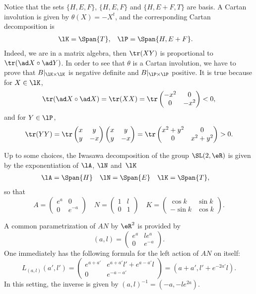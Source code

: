 Notice that the sets $\{ H,E,F \}$, $\{ H,E,F \}$ and $\{ H,E+F,T \}$ are basis. A Cartan involution is given by $\theta(X)=-X^t$, and the corresponding Cartan decomposition is
\begin{align}
   \lK&=\Span\{ T \},
&\lP&=\Span\{ H,E+F \}.
\end{align}
Indeed, we are in a matrix algebra, then $\tr(XY)$ is proportional to $\tr(\ad X\circ \ad Y)$.
 In order to see that $\theta$ is a Cartan involution, we have to prove that $B|_{\lK\times\lK}$ is negative definite and $B|_{\lP\times\lP}$ positive. It is true because for $X\in\lK$,
\[
    \tr(\ad X\circ \ad X)=\tr(XX)=\tr\begin{pmatrix}
-x^2 & 0 \\
0 & -x^2
\end{pmatrix}<0,
\]
and for $Y\in\lP$,
\[
    \tr(YY)=\tr\begin{pmatrix}
x & y \\
y & -x
\end{pmatrix}\begin{pmatrix}
x & y \\
y & -x
\end{pmatrix} =\tr\begin{pmatrix}
x^2+y^2 & 0 \\
0 & x^2+y^2
\end{pmatrix} >0.
\]

Up to some choices, the Iwasawa decomposition\label{pg_iwasldr} of the group $\SL(2,\eR)$ is given by the exponentiation of $\lA$, $\lN$ and~$\lK$
\begin{equation}
\begin{aligned}
  \lA&=\Span\{ H \}
&\lN&=\Span\{ E \}
&\lK&=\Span\{T\},
\end{aligned}
\end{equation}
so that
\begin{equation}\label{eq:expo_ANK}
A=\begin{pmatrix}
e^a & 0 \\
0 & e^{-a}
\end{pmatrix}\quad
N=\begin{pmatrix}
1 & l \\
0 & 1
\end{pmatrix}\quad
K=\begin{pmatrix}
\cos k & \sin k \\
-\sin k & \cos k
\end{pmatrix}.
\end{equation}

A common parametrization of $AN$ by $\eR^2$ is provided by
\begin{equation}   \label{EqParmalSL}
(a,l)=
\begin{pmatrix}
  e^a&le^a\\
  0  &e^{-a}
\end{pmatrix}.
\end{equation}
One immediately has the following formula for the left action of $AN$ on itself:
\[
  L_{(a,l)}(a',l')=\begin{pmatrix}
e^{a+a'} & e^{a+a'}l'+e^{a-a'}l \\
0 & e^{-a-a'}
\end{pmatrix}=(a+a',l'+e^{-2a'}l).
\]
In this setting, the inverse is given by $(a,l)^{-1}=(-a,-l e^{2a})$.

